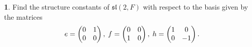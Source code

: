 \documentclass[12pt]{article}
\renewcommand{\sl}{\mathfrak{sl}}
\theoremstyle{definition}
\newtheorem{ex}{}
\begin{document}
\begin{ex}
	Find the structure constants of $\sl(2, F)$ with respect to the basis given by the matrices \begin{equation*}
		e = \begin{pmatrix} 0 & 1 \\ 0 & 0 \end{pmatrix}, \hspace{0.25em} f = \begin{pmatrix}0 & 0 \\ 1 & 0\end{pmatrix}, \hspace{0.25em} h = \begin{pmatrix}1 & 0 \\ 0 & -1\end{pmatrix}.
	\end{equation*}
\end{ex}
\end{document}

